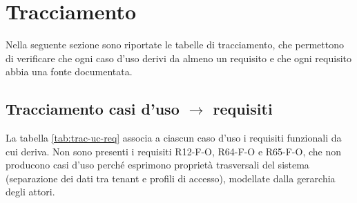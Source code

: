\section{Tracciamento}

Nella seguente sezione sono riportate le tabelle di tracciamento, che permettono di verificare che ogni caso d'uso derivi da almeno un requisito e che ogni requisito abbia una fonte documentata.

\subsection{Tracciamento casi d'uso \texorpdfstring{$\rightarrow$}{→} requisiti}
La tabella \ref{tab:trac-uc-req} associa a ciascun caso d'uso i requisiti funzionali da cui deriva. Non sono presenti i requisiti R12-F-O, R64-F-O e R65-F-O, che non producono casi d'uso perché esprimono proprietà trasversali del sistema (separazione dei dati tra tenant e profili di accesso), modellate dalla gerarchia degli attori.

